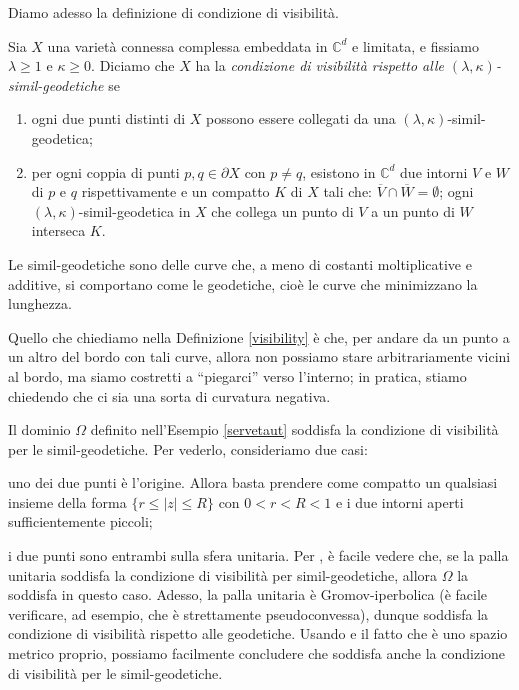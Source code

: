 Diamo adesso la definizione di condizione di visibilità.

\begin{defn} \label{visibility}
    Sia $X$ una varietà connessa complessa embeddata in $\mathbb{C}^d$ e limitata, e fissiamo $\lambda \ge 1$ e $\kappa \ge 0$. Diciamo che $X$ ha la \textit{condizione di visibilità rispetto alle $(\lambda,\kappa)$-simil-geodetiche} se
    \begin{enumerate}
        \item ogni due punti distinti di $X$ possono essere collegati da una $(\lambda,\kappa)$-simil-geodetica;
        \item per ogni coppia di punti $p,q\in\partial X$ con $p\not=q$, esistono in $\mathbb{C}^d$ due intorni $V$ e $W$ di $p$ e $q$ rispettivamente e un compatto $K$ di $X$ tali che: $\overline{V}\cap\overline{W}=\emptyset$; ogni $(\lambda,\kappa)$-simil-geodetica in $X$ che collega un punto di $V$ a un punto di $W$ interseca $K$.
    \end{enumerate}
\end{defn}

Le simil-geodetiche sono delle curve che, a meno di costanti moltiplicative e additive, si comportano come le geodetiche, cioè le curve che minimizzano la lunghezza.

Quello che chiediamo nella Definizione \ref{visibility} è che, per andare da un punto a un altro del bordo con tali curve, allora non possiamo stare arbitrariamente vicini al bordo, ma siamo costretti a ``piegarci'' verso l'interno; in pratica, stiamo chiedendo che ci sia una sorta di curvatura negativa.

\begin{ftt}
    Il dominio $\Omega$ definito nell'Esempio \ref{servetaut} soddisfa la condizione di visibilità per le simil-geodetiche. Per vederlo, consideriamo due casi:
    \begin{nlist}
        \item uno dei due punti è l'origine. Allora basta prendere come compatto un qualsiasi insieme della forma $\{r \le |z| \le R\}$ con $0<r<R<1$ e i due intorni aperti sufficientemente piccoli;
        \item i due punti sono entrambi sulla sfera unitaria. Per \cite[Proposition 6]{NTT}, è facile vedere che, se la palla unitaria soddisfa la condizione di visibilità per simil-geodetiche, allora $\Omega$ la soddisfa in questo caso. Adesso, la palla unitaria è Gromov-iperbolica (è facile verificare, ad esempio, che è strettamente pseudoconvessa), dunque soddisfa la condizione di visibilità rispetto alle geodetiche. Usando \cite[Part III, Chapter H, Paragraph 1, Theorem 1.7]{BH} e il fatto che è uno spazio metrico proprio, possiamo facilmente concludere che soddisfa anche la condizione di visibilità per le simil-geodetiche.
    \end{nlist}
\end{ftt}
